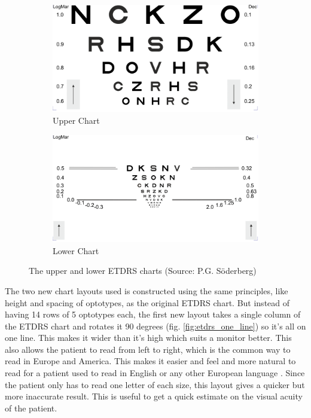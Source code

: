 \documentclass[12pt,a4paper,notitlepage]{report}
\begin{document}
\begin{figure}[ht!]
\centering
\begin{subfigure}{.8\textwidth}
  \centering
  \includegraphics[width=100mm]{images/etdrs_top.png}
  \caption{Upper Chart}
  \label{fig:etdrs_upper}
\end{subfigure}%

\begin{subfigure}{.8\textwidth}
  \centering
  \includegraphics[width=100mm]{images/etdrs_bottom.png}
  \caption{Lower Chart}
  \label{fig:etdrs_lower}
\end{subfigure}
\caption[Upper and lower ETDRS charts]{The upper and lower ETDRS charts (Source: P.G. Söderberg)}
\label{fig:etdrs_upper_lower}
\end{figure}

The two new chart layouts used is constructed using the same principles, like height and spacing of optotypes, as the original ETDRS chart. But instead of having 14 rows of 5 optotypes each, the first new layout takes a single column of the ETDRS chart and rotates it 90 degrees (fig. \ref{fig:etdrs_one_line}) so it's all on one line. This makes it wider than it's high which suits a monitor better. This also allows the patient to read from left to right, which is the common way to read in Europe and America. This makes it easier and feel and more natural to read for a patient used to read in English or any other European language \cite{PGSoderbergOral}. Since the patient only has to read one letter of each size, this layout gives a quicker but more inaccurate result. This is useful to get a quick estimate on the visual acuity of the patient.
\end{document}
